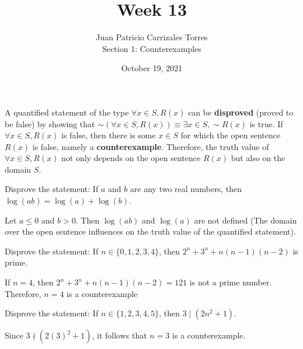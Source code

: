 \documentclass[12pt]{article}
\newenvironment{problem}[2][Problem]{\begin{trivlist}
		\item[\hskip \labelsep {\bfseries #1}\hskip \labelsep {\bfseries #2.}]}{\end{trivlist}}
\newenvironment{solution}[2][Solution]{\begin{trivlist}
		\item[\hskip \labelsep {\bfseries #1}\hskip \labelsep {\bfseries #2.}]}{\end{trivlist}}
\begin{document}
	
	\title{Week 13}
	\author{Juan Patricio Carrizales Torres \\
		Section 1: Counterexamples}
	\date{October 19, 2021}
	\maketitle

	A quantified statement of the type $\forall x \in S, R(x)$ can be \textbf{disproved} (proved to be false) by showing that $\sim (\forall x \in S, R(x)) \equiv \exists x \in S, \sim R(x)$ is true. If $\forall x \in S, R(x)$ is false, then there is some $x\in S$ for which the open sentence $R(x)$ is false, namely a \textbf{counterexample}. Therefore, the truth value of $\forall x \in S, R(x)$ not only depends on the open sentence $R(x)$ but also on the domain $S$.
	
	\begin{problem}{1}
		Disprove the statement: If $a$ and $b$ are any two real numbers, then $\log(ab) = \log(a) + \log(b)$.
		\begin{solution}{}
			Let $a\leq 0$ and $b>0$. Then $\log(ab)$ and $\log(a)$ are not defined (The domain over the open sentence influences on the truth value of the quantified statement).
		\end{solution}
	\end{problem}

	\begin{problem}{2}
		Disprove the statement: If $n\in \{0,1,2,3,4\}$, then $2^{n}+3^{n}+n(n-1)(n-2)$ is prime.
		\begin{solution}{}
			If $n=4$, then $2^{n}+3^{n}+n(n-1)(n-2) = 121$ is not a prime number. Therefore, $n=4$ is a counterexample
		\end{solution}
	\end{problem}

	\begin{problem}{3}
		Disprove the statement: If $n\in \{1,2,3,4,5\}$, then $3\mid (2n^{2}+1)$.
		\begin{solution}{}
			Since $3\nmid (2(3)^{2}+1)$, it follows that $n=3$ is a counterexample.
		\end{solution}
	\end{problem}
\end{document}
